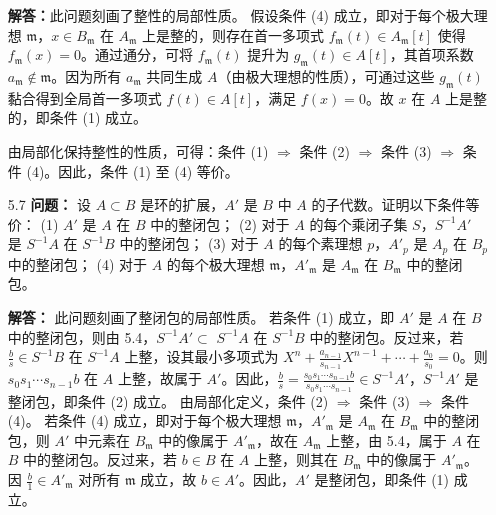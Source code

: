 \documentclass[UTF8]{ctexart}
\begin{document}
\begin{enumerate}
\textbf{解答：}此问题刻画了整性的局部性质。 假设条件 (4) 成立，即对于每个极大理想 \( \mathfrak{m} \)，\( x \in B_{\mathfrak{m}} \) 在 \( A_{\mathfrak{m}} \) 上是整的，则存在首一多项式 \( f_{\mathfrak{m}}(t) \in A_{\mathfrak{m}}[t] \) 使得 \( f_{\mathfrak{m}}(x) = 0 \)。通过通分，可将 \( f_{\mathfrak{m}}(t) \) 提升为 \( g_{\mathfrak{m}}(t) \in A[t] \)，其首项系数 \( a_{\mathfrak{m}} \notin \mathfrak{m} \)。因为所有 \( a_{\mathfrak{m}} \) 共同生成 \( A \)（由极大理想的性质），可通过这些 \( g_{\mathfrak{m}}(t) \) 黏合得到全局首一多项式 \( f(t) \in A[t] \)，满足 \( f(x) = 0 \)。故 \( x \) 在 \( A \) 上是整的，即条件 (1) 成立。

由局部化保持整性的性质，可得：条件 (1) \(\Rightarrow\) 条件 (2) \(\Rightarrow\) 条件 (3) \(\Rightarrow\) 条件 (4)。因此，条件 (1) 至 (4) 等价。

\item[5.7] \textbf{问题：} 设 \( A \subset B \) 是环的扩展，\( A' \) 是 \( B \) 中 \( A \) 的子代数。证明以下条件等价：
  \subitem (1) \( A' \) 是 \( A \) 在 \( B \) 中的整闭包；
  \subitem (2) 对于 \( A \) 的每个乘闭子集 \( S \)，\( S^{-1} A' \) 是 \( S^{-1} A \) 在 \( S^{-1} B \) 中的整闭包；
  \subitem (3) 对于 \( A \) 的每个素理想 \( p \)，\( A'_p \) 是 \( A_p \) 在 \( B_p \) 中的整闭包；
  \subitem (4) 对于 \( A \) 的每个极大理想 \( \mathfrak{m} \)，\( A'_{\mathfrak{m}} \) 是 \( A_{\mathfrak{m}} \) 在 \( B_{\mathfrak{m}} \) 中的整闭包。

\textbf{解答：} 
此问题刻画了整闭包的局部性质。
 若条件 (1) 成立，即 \( A' \) 是 \( A \) 在 \( B \) 中的整闭包，则由 5.4，\( S^{-1} A' \subset \) \( S^{-1} A \) 在 \( S^{-1} B \) 中的整闭包。反过来，若 \( \frac{b}{s} \in S^{-1} B \) 在 \( S^{-1} A \) 上整，设其最小多项式为 \( X^n + \frac{a_{n-1}}{s_{n-1}} X^{n-1} + \cdots + \frac{a_0}{s_0} = 0 \)。则 \( s_0 s_1 \cdots s_{n-1} b \) 在 \( A \) 上整，故属于 \( A' \)。因此，\( \frac{b}{s} = \frac{s_0 s_1 \cdots s_{n-1} b}{s_0 s_1 \cdots s_{n-1}} \in S^{-1} A' \)，\( S^{-1} A' \) 是整闭包，即条件 (2) 成立。
 由局部化定义，条件 (2) \(\Rightarrow\) 条件 (3) \(\Rightarrow\) 条件 (4)。
 若条件 (4) 成立，即对于每个极大理想 \( \mathfrak{m} \)，\( A'_{\mathfrak{m}} \) 是 \( A_{\mathfrak{m}} \) 在 \( B_{\mathfrak{m}} \) 中的整闭包，则 \( A' \) 中元素在 \( B_{\mathfrak{m}} \) 中的像属于 \( A'_{\mathfrak{m}} \)，故在 \( A_{\mathfrak{m}} \) 上整，由 5.4，属于 \( A \) 在 \( B \) 中的整闭包。反过来，若 \( b \in B \) 在 \( A \) 上整，则其在 \( B_{\mathfrak{m}} \) 中的像属于 \( A'_{\mathfrak{m}} \)。因 \( \frac{b}{1} \in A'_{\mathfrak{m}} \) 对所有 \( \mathfrak{m} \) 成立，故 \( b \in A' \)。因此，\( A' \) 是整闭包，即条件 (1) 成立。


\end{enumerate}
\end{document}
